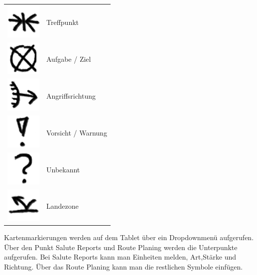 \begin{longtable}{p{3cm} p{15cm}}
	\includegraphics[scale=1]{./Grafiken/KarteUndMarkierungen/Treffpunkt.png} 		&		Treffpunkt \\
	\includegraphics[scale=1]{./Grafiken/KarteUndMarkierungen/Aufgabe.png}		&		Aufgabe / Ziel \\
	\includegraphics[scale=1]{./Grafiken/KarteUndMarkierungen/Angriffsrichtung.png}	& 		Angriffsrichtung \\
	\includegraphics[scale=1]{./Grafiken/KarteUndMarkierungen/Achtung.png}		&		Vorsicht / Warnung \\
	\includegraphics[scale=1]{./Grafiken/KarteUndMarkierungen/FrageUnbekannt.png}	& 		Unbekannt \\
	\includegraphics[scale=1]{./Grafiken/KarteUndMarkierungen/LZ.png}			&		Landezone
\end{longtable}

\newpage

	Kartenmarkierungen werden auf dem Tablet über ein Dropdownmenü aufgerufen. Über den Punkt Salute Reports und Route Planing werden die Unterpunkte aufgerufen. Bei Salute Reports kann man Einheiten melden, Art,Stärke und Richtung. Über das Route Planing kann man die restlichen Symbole einfügen.

